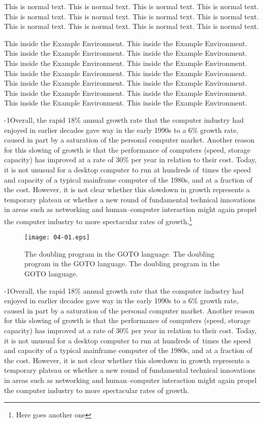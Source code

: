 This is normal text. This is normal text. This is normal text. This is normal text. 
This is normal text. This is normal text. This is normal text. This is normal text. 
This is normal text. This is normal text. This is normal text. This is normal text. 

\begin{example}
This inside the Example Environment. This inside the Example Environment. 
This inside the Example Environment. This inside the Example Environment. 
This inside the Example Environment. This inside the Example Environment. 
This inside the Example Environment. This inside the Example Environment. 
This inside the Example Environment. This inside the Example Environment. 
This inside the Example Environment. This inside the Example Environment. 
This inside the Example Environment. This inside the Example Environment. 
\end{example}

\looseness-1Overall, the rapid 18\% annual growth rate that the computer
industry had enjoyed in earlier decades gave way in the early
1990s to a 6\% growth rate, caused in part by a saturation of the
personal computer market. Another reason for this slowing of
growth is that the performance of computers (speed, storage
capacity) has improved at a rate of 30\% per year in relation to
their cost. Today, it is not unusual for a desktop computer 
to run at hundreds of\, times the speed and capacity of a typical 
mainframe computer of the 1980s, and at a fraction of the cost. However, 
it is not clear whether this slowdown in growth represents a temporary plateau 
or whether a new round of fundamental technical innovations in areas
such as networking and human--computer interaction might again
propel the computer industry to more spectacular rates of growth.\footnote{Here goes another one}

\begin{figure}
\centerline{\texttt{[image: 04-01.eps]}}
\caption{The doubling program in the GOTO language. The doubling program in the GOTO language. The doubling program in the GOTO language.}
\end{figure}

\looseness-1Overall, the rapid 18\% annual growth rate that the computer
industry had enjoyed in earlier decades gave way in the early
1990s to a 6\% growth rate, caused in part by a saturation of the
personal computer market. Another reason for this slowing of
growth is that the performance of computers (speed, storage
capacity) has improved at a rate of 30\% per year in relation to
their cost. Today, it is not unusual for a desktop computer 
to run at hundreds of\, times the speed and capacity of a typical 
mainframe computer of the 1980s, and at a fraction of the cost. However, 
it is not clear whether this slowdown in growth represents a temporary plateau 
or whether a new round of fundamental technical innovations in areas
such as networking and human--computer interaction might again
propel the computer industry to more spectacular rates of growth.

